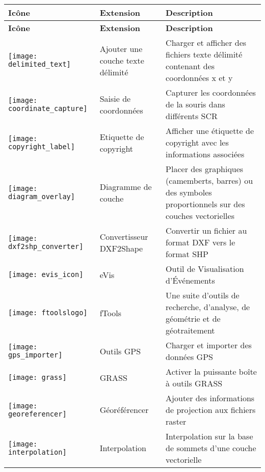{\setlength{\extrarowheight}{15pt}
\small
\begin{longtable}{|l|l|p{8cm}|}
\hline
 \textbf{Icône} & \textbf{Extension} & \textbf{Description}\\
\endfirsthead
\hline
\textbf{Icône} & \textbf{Extension} & \textbf{Description}\\
\endhead
\hline 
\texttt{[image: delimited\_text]}
 & Ajouter une couche texte délimité \index{extensions!texte delimite} & Charger et afficher des fichiers texte délimité contenant des coordonnées x et y\\
\hline
\texttt{[image: coordinate\_capture]}
 & Saisie de coordonnées \index{extensions!saisie de coordonnees} & Capturer les coordonnées de la souris dans différents SCR\\
\hline 
\texttt{[image: copyright\_label]}
 & Etiquette de copyright \index{extensions!copyright} & Afficher une étiquette de copyright avec les informations associées\\
\hline
\texttt{[image: diagram\_overlay]}
 & Diagramme de couche \index{plugins!diagram} & Placer des graphiques (camemberts, barres) ou des symboles proportionnels sur des couches vectorielles\\
\hline
\texttt{[image: dxf2shp\_converter]}
 & Convertisseur DXF2Shape \index{plugins!DXF2Shape} & Convertir un fichier au format DXF vers le format SHP\\
\hline
\texttt{[image: evis\_icon]}
 & eVis & Outil de Visualisation d'Événements\\
\hline
\texttt{[image: ftoolslogo]}
 & fTools \index{plugins!ftools} & Une suite d'outils de recherche, d'analyse, de géométrie et de géotraitement\\
\hline
\texttt{[image: gps\_importer]}
 & Outils GPS \index{plugins!gps} & Charger et importer des données GPS\\
\hline
\texttt{[image: grass]}
 & GRASS \index{plugin!grass toolbox} & Activer la puissante boîte à outils GRASS\\
\hline
\texttt{[image: georeferencer]}
 & Géoréférencer \index{plugin!georeferencer} & Ajouter des informations de projection aux fichiers raster\\
\hline
\texttt{[image: interpolation]}
& Interpolation \index{plugins!Interpolation} & Interpolation sur la base de sommets d'une couche vectorielle\\
\hline

\end{longtable}}
